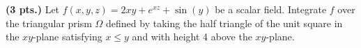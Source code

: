 \documentclass[12pt]{article} %
\begin{document}
\vspace*{0.5cm}

\begin{problem}
\textbf{(3 pts.)} Let $f(x,y,z)=2xy+e^{xz}+\sin(y)$ be a scalar field. Integrate $f$ over the triangular prism $\Omega$ defined by taking the half triangle of the unit square in the $xy$-plane satisfying $x\leq y$ and with height 4 above the $xy$-plane.
\end{problem}
\end{document}
